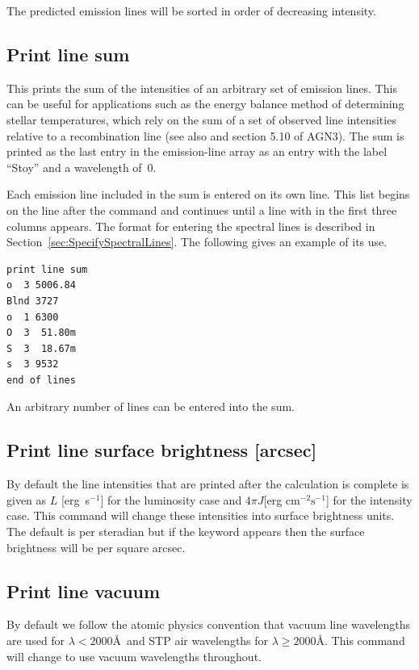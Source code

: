 The predicted emission lines will be sorted in order of decreasing
intensity.

\subsection{Print line sum}

This prints the sum of the intensities of an arbitrary set of emission
lines.
This can be useful for applications such as the \citet{Stoy1933} energy
balance method of determining stellar temperatures, which rely on the sum
of a set of observed line intensities relative to a recombination line (see also \citealp{Kaler1991} and section 5.10 of AGN3).
The sum is printed
as the last entry in the emission-line array as an entry with the label
``Stoy'' and a wavelength of~0.

Each emission line included in the sum is entered on its own line.  This
list begins on the line after the  command and continues until
a line with  in the first three columns appears.
The format for entering the spectral lines is described in Section~\ref{sec:SpecifySpectralLines}.
The following gives
an example of its use.
\begin{verbatim}
print line sum
o  3 5006.84
Blnd 3727
o  1 6300
O  3  51.80m
S  3  18.67m
s  3 9532
end of lines
\end{verbatim}

An arbitrary number of lines can be entered into the sum.

\subsection{Print line surface brightness [arcsec]}
\label{sec:CommandPrintLineSurfaceBrightness}

By default the line intensities that are printed after the calculation
is complete is given as $L$ [erg~s$^{-1}$] for the luminosity case and
$4\pi J$[erg cm$^{-2} \mathrm{s}^{-1}$] for the intensity case.
This command will change these
intensities into surface brightness units.
The default is per steradian
but if the keyword  appears then the surface brightness will be per square arcsec.

\subsection{Print line vacuum}
\label{sec:CommandPrintVacuum}
By default we follow the atomic physics convention that vacuum line wavelengths are used
for $\lambda < 2000$\AA\ and STP air wavelengths for $\lambda \ge 2000$\AA.
This command will change to use vacuum wavelengths throughout.

